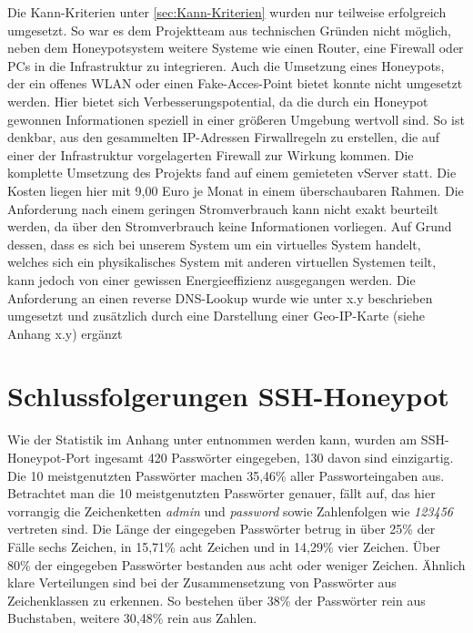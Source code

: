 Die Kann-Kriterien unter \ref{sec:Kann-Kriterien} wurden nur teilweise erfolgreich umgesetzt. So war es dem Projektteam aus technischen Gründen nicht möglich, neben dem Honeypotsystem weitere Systeme wie einen Router, eine Firewall oder PCs in die Infrastruktur zu integrieren. Auch die Umsetzung eines Honeypots, der ein offenes WLAN oder einen Fake-Acces-Point bietet konnte nicht umgesetzt werden. Hier bietet sich Verbesserungspotential, da die durch ein Honeypot gewonnen Informationen speziell in einer größeren Umgebung wertvoll sind. So ist denkbar, aus den gesammelten IP-Adressen Firwallregeln zu erstellen, die auf einer der Infrastruktur vorgelagerten Firewall zur Wirkung kommen.
Die komplette Umsetzung des Projekts fand auf einem gemieteten vServer statt. Die Kosten liegen hier mit 9,00 Euro je Monat in einem überschaubaren Rahmen. Die Anforderung nach einem geringen Stromverbrauch kann nicht exakt beurteilt werden, da über den Stromverbrauch keine Informationen vorliegen. Auf Grund dessen, dass es sich bei unserem System um ein virtuelles System handelt, welches sich ein physikalisches System mit anderen virtuellen Systemen teilt, kann jedoch von einer gewissen Energieeffizienz ausgegangen werden. Die Anforderung an einen reverse DNS-Lookup wurde wie unter x.y beschrieben umgesetzt und zusätzlich durch eine Darstellung einer Geo-IP-Karte (siehe Anhang x.y) ergänzt

\section{Schlussfolgerungen SSH-Honeypot}
\label{sec:Schlussfolgerungen SSH-Honeypot}

Wie der Statistik im Anhang unter  entnommen werden kann, wurden am SSH-Honeypot-Port ingesamt 420 Passwörter eingegeben, 130 davon sind einzigartig. Die 10 meistgenutzten Passwörter machen 35,46\% aller Passworteingaben aus. Betrachtet man die 10 meistgenutzten Passwörter genauer, fällt auf, das hier vorrangig die Zeichenketten \textit{admin} und \textit{password} sowie Zahlenfolgen wie \textit{123456} vertreten sind. Die Länge der eingegeben Passwörter betrug in über 25\% der Fälle sechs Zeichen, in 15,71\% acht Zeichen und in 14,29\% vier Zeichen. Über 80\% der eingegeben Passwörter bestanden aus acht oder weniger Zeichen. Ähnlich klare Verteilungen sind bei der Zusammensetzung von Passwörter aus Zeichenklassen zu erkennen. So bestehen über 38\% der Passwörter rein aus Buchstaben, weitere 30,48\% rein aus Zahlen.\\

